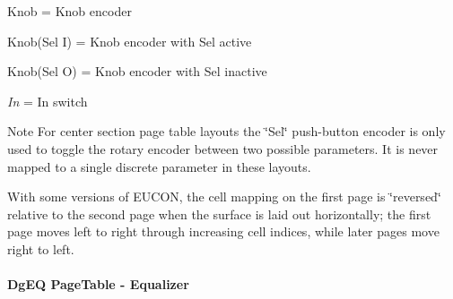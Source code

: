 \begin{DoxyItemize}
\item Knob = Knob encoder  
\item Knob(\+Sel I) = Knob encoder with Sel active  
\item Knob(\+Sel O) = Knob encoder with Sel inactive  
\item {\itshape In} = In switch  
\end{DoxyItemize}

\begin{DoxyNote}{Note}
For center section page table layouts the \char`\"{}\+Sel\char`\"{} push-\/button encoder is only used to toggle the rotary encoder between two possible parameters. It is never mapped to a single discrete parameter in these layouts.

With some versions of E\+U\+C\+ON, the cell mapping on the first page is \char`\"{}reversed\char`\"{} relative to the second page when the surface is laid out horizontally; the first page moves left to right through increasing cell indices, while later pages move right to left.
\end{DoxyNote}
\hypertarget{a00833_aax_page_table_guide_04_avid_center_section_page_tables_eucon_mapping_DgEQ}{}\paragraph{\textquotesingle{}\+Dg\+E\+Q\textquotesingle{} Page\+Table -\/ Equalizer}\label{a00833_aax_page_table_guide_04_avid_center_section_page_tables_eucon_mapping_DgEQ}
 \tabulinesep=1mm
